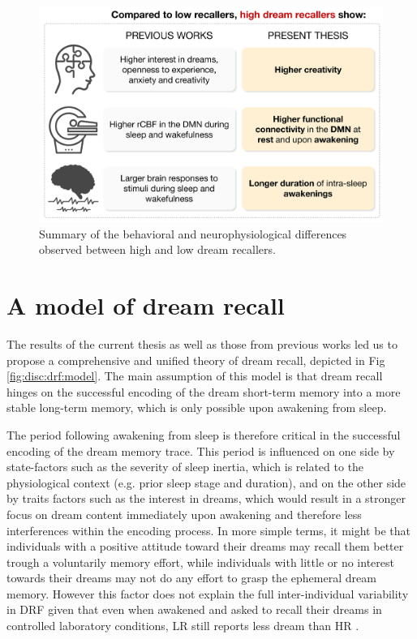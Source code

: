 \begin{figure}[!htbp]
	\includegraphics[width=\textwidth]{Fig/Discussion/HR_recap.png}
	\caption[Summary of the results on DRF]{Summary of the behavioral and neurophysiological differences observed between high and low dream recallers.}
	\label{fig:disc:drf:summary}
\end{figure}

\FloatBarrier

\section{A model of dream recall}
\label{disc:drf:model}

The results of the current thesis as well as those from previous works led us to propose a comprehensive and unified theory of dream recall, depicted in Fig \ref{fig:disc:drf:model}. The main assumption of this model is that dream recall hinges on the successful encoding of the dream short-term memory into a more stable long-term memory, which is only possible upon awakening from sleep.

The period following awakening from sleep is therefore critical in the successful encoding of the dream memory trace. This period is influenced on one side by state-factors such as the severity of sleep inertia, which is related to the physiological context (e.g. prior sleep stage and duration), and on the other side by traits factors such as the interest in dreams, which would result in a stronger focus on dream content immediately upon awakening and therefore less interferences within the encoding process. In more simple terms, it might be that individuals with a positive attitude toward their dreams may recall them better trough a voluntarily memory effort, while individuals with little or no interest towards their dreams may not do any effort to grasp the ephemeral dream memory. However this factor does not explain the full inter-individual variability in DRF given that even when awakened and asked to recall their dreams in controlled laboratory conditions, LR still reports less dream than HR \citep{eichenlaub_brain_2014, eichenlaub_resting_2014}.

